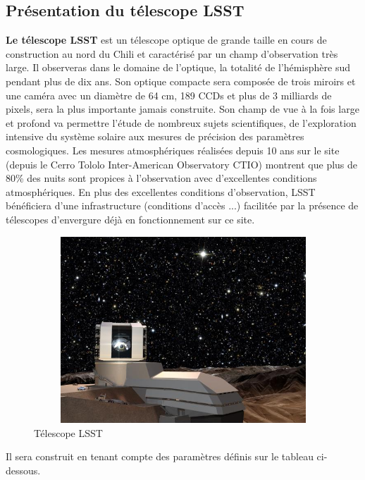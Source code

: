 \subsection{Présentation du télescope LSST}
\textbf{Le télescope LSST} est un télescope optique de grande taille en cours de construction au nord du Chili et caractérisé par un champ d’observation très large. Il observeras dans le domaine de l'optique, la totalité de l'hémisphère sud pendant plus de dix ans.
Son optique compacte sera composée de trois miroirs et une caméra avec un diamètre de 64 cm, 189 CCDs et plus de 3 milliards de pixels, sera la plus importante jamais construite. Son champ de vue à la fois large et profond va permettre l'étude de nombreux sujets scientifiques, de l'exploration intensive du système solaire aux mesures de précision des paramètres cosmologiques. 
Les mesures atmosphériques réalisées depuis 10 ans sur le site (depuis le Cerro Tololo Inter-American Observatory CTIO) montrent que plus de 80\% des nuits sont propices à l'observation avec d'excellentes conditions atmosphériques.
En plus des excellentes conditions d'observation, LSST bénéficiera d'une infrastructure (conditions d'accès ...) facilitée par la présence de télescopes d'envergure déjà en fonctionnement sur ce site. 
\newline
\newline
\begin{figure}[!h]
    \centering
    \includegraphics[width=12cm,height=7cm]{report/figures/LSST.jpg}
    \caption{Télescope LSST}
    \label{fig:modeling_shema}
\end{figure}
\newline Il sera construit en tenant compte des paramètres définis sur le tableau ci-dessous.
\newline
